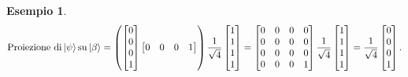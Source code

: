 \documentclass{book}
\theoremstyle{definition}
\theoremstyle{definition}
\theoremstyle{definition}
\newtheorem*{ex}{Esempio}
\theoremstyle{plain}
\theoremstyle{plain}
\theoremstyle{plain}
\theoremstyle{plain}
\begin{document}
\begin{ex}
\begin{displaymath}
\text{Proiezione di} \ket{\psi} \text{su} \ket{\beta} = \left( \begin{bmatrix}
0 \\
0 \\
0 \\
1
\end{bmatrix} \begin{bmatrix}
0 & 0 & 0 & 1
\end{bmatrix}
\right)
\frac{1}{\sqrt{4}} \begin{bmatrix}
1 \\
1 \\
1 \\
1
\end{bmatrix} = \begin{bmatrix}
0 & 0 & 0 & 0 \\
0 & 0 & 0 & 0 \\
0 & 0 & 0 & 0 \\
0 & 0 & 0 & 1
\end{bmatrix} \frac{1}{\sqrt{4}} \begin{bmatrix}
1 \\
1 \\
1 \\
1
\end{bmatrix} = \frac{1}{\sqrt{4}} \begin{bmatrix}
0 \\
0 \\
0 \\
1
\end{bmatrix}.
\end{displaymath}


\end{ex}
\end{document}
